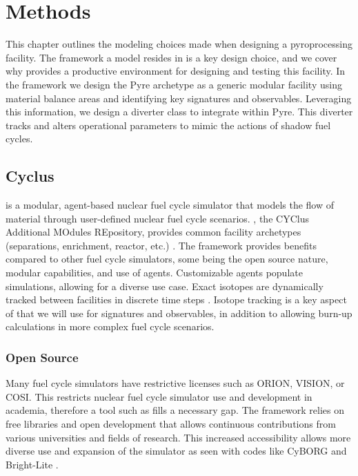 \chapter[Methods]{Methods}
This chapter outlines the modeling choices made when designing a pyroprocessing facility. 
The framework a model resides in is a key design choice, and we cover why \Cyclus provides
a productive environment for designing and testing this facility. In the \Cyclus framework we
design the Pyre archetype as a generic modular facility using material balance areas and identifying key signatures and observables. Leveraging this information, we design a diverter class to integrate within Pyre. This diverter tracks and alters operational parameters to mimic
the actions of shadow fuel cycles.

\section{Cyclus}

\Cyclus is a modular, agent-based nuclear fuel cycle simulator that models the flow of material through user-defined nuclear fuel cycle scenarios. \Cycamore, the CYClus 
Additional MOdules REpository, provides common facility archetypes (separations, enrichment, reactor, etc.) \cite{carlsen_cycamore_2014}. 
The \Cyclus framework provides benefits compared to other fuel cycle simulators, some being the open source nature, modular capabilities, and use of agents.
Customizable agents populate simulations, allowing for a diverse use case. Exact isotopes are dynamically tracked between facilities in discrete time steps \cite{huff_fundamental_2016}.
Isotope tracking is a key aspect of \Cyclus that we will use for signatures and observables, in addition to allowing burn-up calculations in more complex fuel cycle scenarios.

\subsection{Open Source}

Many fuel cycle simulators have restrictive licenses such as ORION, VISION, or COSI. This restricts
nuclear fuel cycle simulator use and development in academia, therefore a tool such as \Cyclus fills a necessary gap. The \Cyclus framework relies on
free libraries and open development that allows continuous contributions from various universities and fields of research. This increased accessibility allows
more diverse use and expansion of the simulator as seen with codes like CyBORG and Bright-Lite \cite{skutnik_cyborg:_2016,schneider_integrated_2016}.

